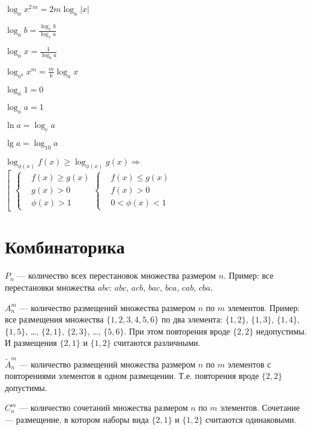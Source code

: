 $ \log_a x^{2\, m} = 2m \log_a |x| $

$ \log_a b = \frac{\log_x b}{\log_x a} $

$ \log_a x = \frac{1}{\log_b a} $

$ \log_{a^k} x^m = \frac{m}{k} \log_a x $

$ \log_a 1 = 0 $

$ \log_a a = 1 $

$ \ln a = \log_e a $

$ \lg a = \log_{10} a $

$ \log_{\phi(x)} f(x) \ge \log_{\phi(x)} g(x) \Rightarrow $ $ \left[
\begin{aligned}
	\left\{ \begin{aligned}
		& f(x) \ge g(x) \\
		& g(x) > 0 \\
		& \phi(x) > 1
	\end{aligned} \right.
	\left\{ \begin{aligned}
		& f(x) \le g(x) \\
		& f(x) > 0 \\
		& 0 < \phi(x) < 1
	\end{aligned} \right.
\end{aligned} \right. $

	
\section{Комбинаторика}

$ P_n $ --- количество всех перестановок множества размером $ n $. Пример: все перестановки множества $abc$: $abc$, $acb$, $bac$, $bca$, $cab$, $cba$.

$ A^m_n $ --- количество размещений множества размером $ n $ по $ m $ элементов. Пример: все размещения множества $ \{1, 2, 3, 4, 5, 6 \} $ по два элемента: $ \{1, 2\} $, $ \{1, 3\} $, $ \{1, 4\} $, $ \{1, 5\} $, \dots, $ \{2, 1\} $, $ \{2, 3\} $,  \dots, $ \{5, 6\} $. При этом повторения вроде $ \{2, 2\} $ недопустимы. И размещения $ \{2, 1 \} $ и $ \{ 1, 2 \} $ считаются различными.

$ \widetilde{A}^m_n $ --- количество размещений множества размером $ n $ по $ m $ элементов с повторениями элементов в одном размещении. Т.е. повторения вроде $ \{2, 2\} $ допустимы.

$ C^m_n $ --- количество сочетаний множества размером $n$ по $m$ элементов. Сочетание --- размещение, в котором наборы вида $ \{2, 1 \} $ и $ \{ 1, 2 \} $ считаются одинаковыми.

